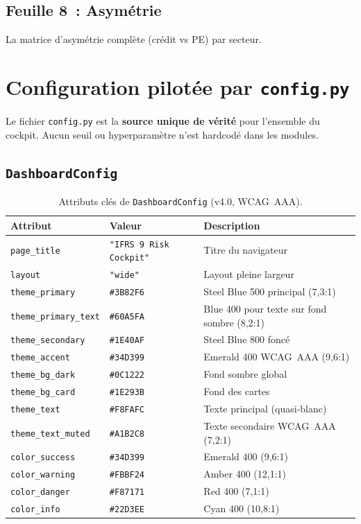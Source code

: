 \documentclass[12pt,a4paper]{article}
\begin{document}
\subsection{Feuille 8~: Asym\'etrie}

La matrice d'asym\'etrie compl\`ete (cr\'edit vs PE) par secteur.


\section{Configuration pilot\'ee par \texttt{config.py}}
\label{sec:config}

Le fichier \texttt{config.py} est la \textbf{source unique de v\'erit\'e} pour l'ensemble du cockpit. Aucun seuil ou hyperparam\`etre n'est hardcod\'e dans les modules.

\subsection{\texttt{DashboardConfig}}

\begin{table}[ht]
\centering
\caption{Attributs cl\'es de \texttt{DashboardConfig} (v4.0, WCAG~AAA).}
\label{tab:dashconfig}
\small
\begin{tabular}{@{}llp{5cm}@{}}
\toprule
\textbf{Attribut} & \textbf{Valeur} & \textbf{Description} \\
\midrule
\texttt{page\_title} & \texttt{"IFRS 9 Risk Cockpit"} & Titre du navigateur \\
\texttt{layout} & \texttt{"wide"} & Layout pleine largeur \\
\texttt{theme\_primary} & \texttt{\#3B82F6} & Steel Blue 500 principal (7,3:1) \\
\texttt{theme\_primary\_text} & \texttt{\#60A5FA} & Blue 400 pour texte sur fond sombre (8,2:1) \\
\texttt{theme\_secondary} & \texttt{\#1E40AF} & Steel Blue 800 fonc\'e \\
\texttt{theme\_accent} & \texttt{\#34D399} & Emerald 400 WCAG~AAA (9,6:1) \\
\texttt{theme\_bg\_dark} & \texttt{\#0C1222} & Fond sombre global \\
\texttt{theme\_bg\_card} & \texttt{\#1E293B} & Fond des cartes \\
\texttt{theme\_text} & \texttt{\#F8FAFC} & Texte principal (quasi-blanc) \\
\texttt{theme\_text\_muted} & \texttt{\#A1B2C8} & Texte secondaire WCAG~AAA (7,2:1) \\
\texttt{color\_success} & \texttt{\#34D399} & Emerald 400 (9,6:1) \\
\texttt{color\_warning} & \texttt{\#FBBF24} & Amber 400 (12,1:1) \\
\texttt{color\_danger} & \texttt{\#F87171} & Red 400 (7,1:1) \\
\texttt{color\_info} & \texttt{\#22D3EE} & Cyan 400 (10,8:1) \\
\bottomrule
\end{tabular}
\end{table}
\end{document}
